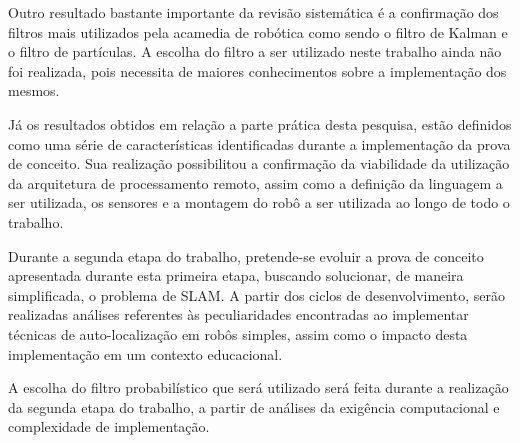 	Outro resultado bastante importante da revisão sistemática é a confirmação dos filtros mais utilizados pela acamedia de robótica como sendo o filtro de Kalman e o filtro de partículas. A escolha do filtro a ser utilizado neste trabalho ainda não foi realizada, pois necessita de maiores conhecimentos sobre a implementação dos mesmos.

	Já os resultados obtidos em relação a parte prática desta pesquisa, estão definidos como uma série de características identificadas durante a implementação da prova de conceito. Sua realização possibilitou a confirmação da viabilidade da utilização da arquitetura de processamento remoto, assim como a definição da linguagem a ser utilizada, os sensores e a montagem do robô a ser utilizada ao longo de todo o trabalho.

	Durante a segunda etapa do trabalho, pretende-se evoluir a prova de conceito apresentada durante esta primeira etapa, buscando solucionar, de maneira simplificada, o problema de SLAM. A partir dos ciclos de desenvolvimento, serão realizadas análises referentes às peculiaridades encontradas ao implementar técnicas de auto-localização em robôs simples, assim como o impacto desta implementação em um contexto educacional.

	A escolha do filtro probabilístico que será utilizado será feita durante a realização da segunda etapa do trabalho, a partir de análises da exigência computacional e complexidade de implementação. 

